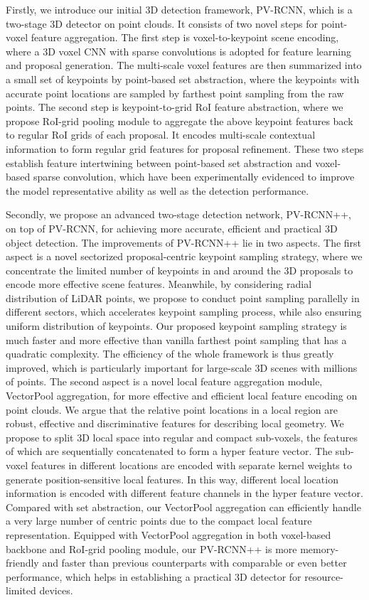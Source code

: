 \documentclass[natbib,twocolumn]{svjour3}          \smartqed  \usepackage{graphicx}
\begin{document}
Firstly, we introduce our initial 3D detection framework, PV-RCNN, which is a two-stage 3D detector on point clouds.
It consists of two novel steps for point-voxel feature aggregation.
The first step is voxel-to-keypoint scene encoding, where a 3D voxel CNN with sparse convolutions is adopted for feature learning and proposal generation. The multi-scale voxel features are then summarized into a small set of keypoints by point-based set abstraction, where the keypoints with accurate point locations are sampled by farthest point sampling from the raw points. 
The second step is keypoint-to-grid RoI feature abstraction, where we propose RoI-grid pooling module to aggregate the above keypoint features back to regular RoI grids of each proposal. It encodes multi-scale contextual information to form regular grid features for proposal refinement.
These two steps establish feature intertwining between point-based set abstraction and voxel-based sparse convolution, which have been experimentally evidenced to improve the model representative ability as well as the detection performance.


Secondly, we propose an advanced two-stage detection network, PV-RCNN++, on top of PV-RCNN, for achieving more accurate, efficient and practical 3D object detection. The improvements of PV-RCNN++ lie in two aspects.
The first aspect is a novel sectorized proposal-centric keypoint sampling strategy, where we concentrate the limited number of keypoints in and around the 3D proposals to encode more effective scene features. 
Meanwhile, by considering radial distribution of LiDAR points, we propose to conduct point sampling parallelly in different sectors, which accelerates keypoint sampling process, while also ensuring uniform distribution of keypoints.
Our proposed keypoint sampling strategy is much faster and more effective than vanilla farthest point sampling that has a quadratic complexity. The efficiency of the whole framework is thus greatly improved, which is particularly important for large-scale 3D scenes with millions of points. 
The second aspect is a novel local feature aggregation module, VectorPool aggregation, for more effective and efficient local feature encoding on point clouds.
We argue that the relative point locations in a local region are robust, effective and discriminative features for describing local geometry.
We propose to split 3D local space into regular and compact sub-voxels, the features of which are sequentially concatenated to form a hyper feature vector.  
The sub-voxel features in different locations are encoded with separate kernel weights to generate position-sensitive local features. 
In this way, different local location information is encoded with different feature channels in the hyper feature vector.
Compared with set abstraction, our VectorPool aggregation can efficiently handle a very large number of centric points due to the compact local feature representation.
Equipped with VectorPool aggregation in both voxel-based backbone and RoI-grid pooling module, our PV-RCNN++ is more memory-friendly and faster than previous counterparts with comparable or even better performance, which helps in establishing a practical 3D detector for resource-limited devices.
\end{document}
